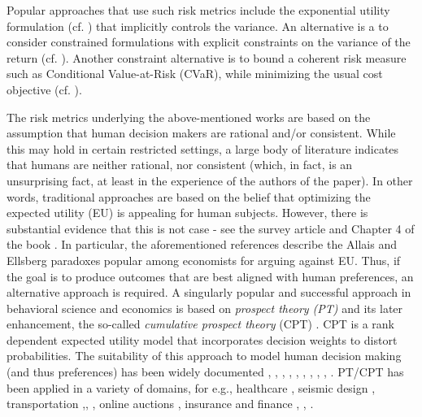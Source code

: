 
Popular approaches that use such risk metrics include the exponential utility formulation 
(cf. \cite{borkar2010learning}) that implicitly controls the variance.
An alternative is a to consider constrained formulations 
with explicit constraints on the variance of the return (cf. \cite{tamar2012policy,Prashanth13AC}). 
Another constraint alternative is to bound a coherent risk measure such as Conditional Value-at-Risk (CVaR), 
while minimizing the usual cost objective (cf. \cite{borkar2010risk,prashanth2014policy}).  

The risk metrics underlying the above-mentioned works 
are based on the assumption that human decision makers are rational and/or consistent.
While this may hold in certain restricted settings, a large body of literature indicates that humans are neither rational,
nor consistent (which, in fact, is an unsurprising fact, at least in the experience of the authors of the paper).
In other words, traditional approaches are based on the belief that optimizing the expected utility (EU) is appealing for human subjects. However, there is substantial evidence that this is not case - see 
the survey article \cite{starmer2000developments} and Chapter 4 of the book \cite{quiggin2012generalized}. In particular, the aforementioned references describe the Allais and Ellsberg paradoxes popular among economists for arguing against EU. 
Thus, if the goal is to produce outcomes that are best aligned with human preferences,
an alternative approach is required.
A singularly popular and successful approach in behavioral science and economics
is based on \textit{prospect theory (PT)} \cite{kahneman1979prospect} 
and its later enhancement, the so-called \textit{cumulative prospect theory} (CPT) \cite{tversky1992advances}.
CPT is a rank dependent expected utility model \cite{quiggin2012generalized} that incorporates decision weights to distort probabilities. 
The suitability of this approach to model human decision making (and thus preferences) has been widely documented \cite{prelec1998probability}, \cite{wu1996curvature}, \cite{conlisk1989three}, \cite{camerer1989experimental}, \cite{camerer1992recent}, \cite{harless1992predictions}, \cite{sopher1993test}, \cite{camerer1994violations}, \cite{gonzalez1999shape}, \cite{abdellaoui2000parameter}.
PT/CPT has been applied in a variety of domains, for e.g., healthcare \cite{lenert1999associations},  seismic design \cite{goda2008application}, transportation \cite{gao2010adaptive},\cite{fujii2004drivers}, \cite{ramming2001network}, online auctions \cite{weinberg2005exploring}, insurance  \cite{machina1995non} and finance \cite{barberis1999prospect}, \cite{epstein1989substitution}, \cite{epstein1991substitution}.
\fi

